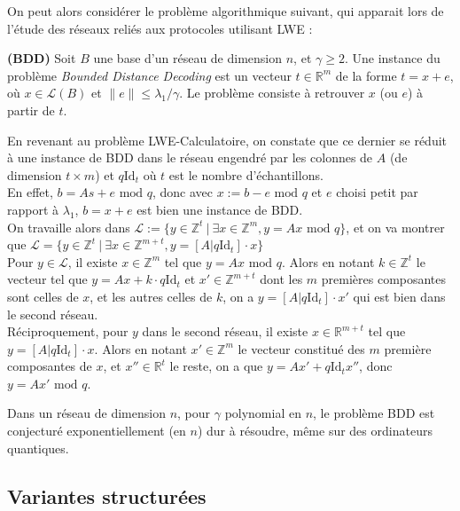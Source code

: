 \documentclass[11pt,a4paper]{article}
\begin{document}
On peut alors considérer le problème algorithmique suivant, qui apparait lors de l'étude des réseaux reliés aux protocoles utilisant LWE : 

\begin{defin}\textbf{(BDD)}
Soit $B$ une base d'un réseau de dimension $n$, et $\gamma \geq 2$. Une instance du problème \textit{Bounded Distance Decoding} est un vecteur $t \in \mathbb{R}^m$ de la forme $t=x+e$, où $x\in \mathcal{L}(B)$ et $\|e\| \leq \lambda_1/\gamma$. Le problème consiste à retrouver $x$ (ou $e$) à partir de $t$.
\end{defin}

En revenant au problème LWE-Calculatoire, on constate que ce dernier se réduit à une instance de BDD dans le réseau engendré par les colonnes de $A$ (de dimension $t\times m$) et $q\text{Id}_t$ où $t$ est le nombre d'échantillons. \\
En effet, $b=As +e \text{ mod } q$, donc avec $x:= b-e \text{ mod } q$ et $e$ choisi petit par rapport à $\lambda_1$, $b=x+e$ est bien une instance de BDD. \\
On travaille alors dans $\mathcal{L} := \{y \in \mathbb{Z}^{t} \ | \ \exists x \in \mathbb{Z}^m, y=Ax \text{ mod } q \}$, et on va montrer que $\mathcal{L}=\{y \in \mathbb{Z}^{t} \ | \ \exists x \in \mathbb{Z}^{m+t}, y=[A|q\text{Id}_{t}]\cdot x  \}$  \\
Pour $y \in \mathcal{L}$, il existe $x \in \mathbb{Z}^m$ tel que $y=Ax \text{ mod } q$. Alors en notant $k \in \mathbb{Z}^{t}$ le vecteur tel que $y=Ax + k\cdot q\text{Id}_{t}$ et $x' \in \mathbb{Z}^{m+t}$ dont les $m$ premières composantes sont celles de $x$, et les autres celles de $k$, on a $y=[A|q\text{Id}_{t}]\cdot x'$ qui est bien dans le second réseau.\\
Réciproquement, pour $y$ dans le second réseau, il existe $x \in \mathbb{R}^{m+t}$ tel que $y=[A|q\text{Id}_{t}]\cdot x$. Alors en notant $x'\in \mathbb{Z}^m$ le vecteur constitué des $m$ première composantes de $x$, et $x''\in \mathbb{R}^{t}$ le reste, on a que $y=Ax'+q\text{Id}_{t}x''$, donc $y = Ax' \text{ mod } q$.
\\

\begin{conj}
Dans un réseau de dimension $n$, pour $\gamma$ polynomial en $n$, le problème BDD est conjecturé exponentiellement (en $n$) dur à résoudre, même sur des ordinateurs quantiques.
\end{conj}

\subsection{Variantes structurées}
\end{document}
